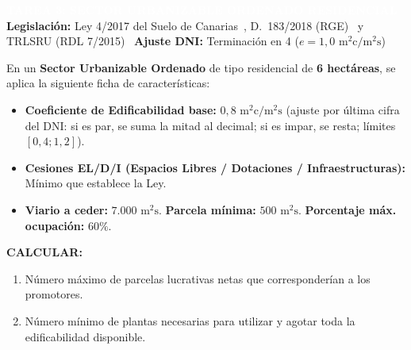 \documentclass[11pt,a4paper]{article}
\begin{document}
\begin{tcolorbox}[enhanced, colback=navyblue, colframe=navyblue, arc=2mm, left=4mm, right=4mm, top=3mm, bottom=3mm]
  \textcolor{white}{\textbf{\large TAREA 3: SECTOR URBANIZABLE ORDENADO RESIDENCIAL}} \\
  \textcolor{white!85}{\small \textbf{Legislación:} Ley 4/2017 del Suelo de Canarias~\cite{ley4_2017_canarias}, D.~183/2018 (RGE)~\cite{decreto183_2018_canarias} y TRLSRU (RDL 7/2015)~\cite{trlsru2015}} \hfill
  \textcolor{white!90}{\small \textbf{Ajuste DNI:} Terminación en 4 ($e = 1,0\text{ m}^2\text{c}/\text{m}^2\text{s}$)}
\end{tcolorbox}

\begin{tcolorbox}[basebox, colframe=accentblue!60, colback=blue!2!white, title={\small\bfseries Ficha Urbanística y Cuestiones del Ejercicio}, coltitle=navyblue]
  \small
  En un \textbf{Sector Urbanizable Ordenado} de tipo residencial de \textbf{6 hectáreas}, se aplica la siguiente ficha de características:
  \begin{itemize}
    \item \textbf{Coeficiente de Edificabilidad base:} $0,8\text{ m}^2\text{c}/\text{m}^2\text{s}$ (ajuste por última cifra del DNI: si es par, se suma la mitad al decimal; si es impar, se resta; límites $[0,4 ; 1,2]$).
    \item \textbf{Cesiones EL/D/I (Espacios Libres / Dotaciones / Infraestructuras):} Mínimo que establece la Ley.
    \item \textbf{Viario a ceder:} $7.000\text{ m}^2\text{s}$. \quad \textbf{Parcela mínima:} $500\text{ m}^2\text{s}$. \quad \textbf{Porcentaje máx. ocupación:} $60\%$.
  \end{itemize}
  \textbf{CALCULAR:}
  \begin{enumerate}[label=\textbf{\alph*)}]
    \item Número máximo de parcelas lucrativas netas que corresponderían a los promotores.
    \item Número mínimo de plantas necesarias para utilizar y agotar toda la edificabilidad disponible.
  \end{enumerate}
\end{tcolorbox}
\end{document}
